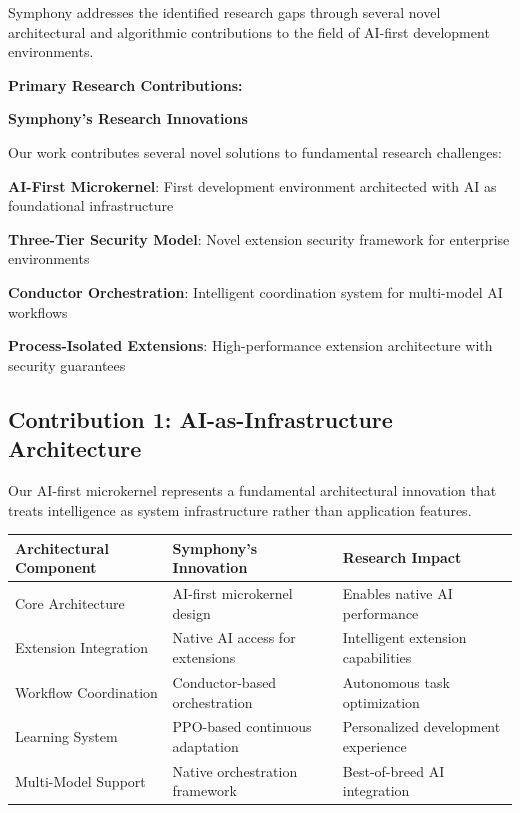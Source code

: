 Symphony addresses the identified research gaps through several novel architectural and algorithmic contributions to the field of AI-first development environments.

\textbf{Primary Research Contributions:}

\begin{successbox}
\textbf{Symphony's Research Innovations}

Our work contributes several novel solutions to fundamental research challenges:
\begin{expandedlist}
    \item \textbf{AI-First Microkernel}: First development environment architected with AI as foundational infrastructure
    \item \textbf{Three-Tier Security Model}: Novel extension security framework for enterprise environments
    \item \textbf{Conductor Orchestration}: Intelligent coordination system for multi-model AI workflows
    \item \textbf{Process-Isolated Extensions}: High-performance extension architecture with security guarantees
\end{expandedlist}
\end{successbox}

\subsection{Contribution 1: AI-as-Infrastructure Architecture}
\label{subsec:ai-infrastructure-contribution}

Our AI-first microkernel represents a fundamental architectural innovation that treats intelligence as system infrastructure rather than application features.

\begin{center}
\begin{tabular}{@{}p{4cm}p{5cm}p{3cm}@{}}
\toprule
\textbf{Architectural Component} & \textbf{Symphony's Innovation} & \textbf{Research Impact} \\
\midrule
Core Architecture & AI-first microkernel design & Enables native AI performance \\
Extension Integration & Native AI access for extensions & Intelligent extension capabilities \\
Workflow Coordination & Conductor-based orchestration & Autonomous task optimization \\
Learning System & PPO-based continuous adaptation & Personalized development experience \\
Multi-Model Support & Native orchestration framework & Best-of-breed AI integration \\
\bottomrule
\end{tabular}
\label{tab:ai-infrastructure-contributions}
\end{center}

